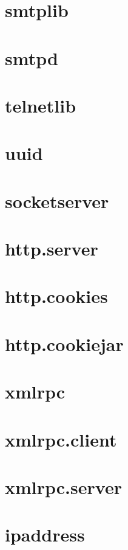 \section{smtplib}






\section{smtpd}






\section{telnetlib}






\section{uuid}






\section{socketserver}






\section{http.server}






\section{http.cookies}






\section{http.cookiejar}






\section{xmlrpc}







\section{xmlrpc.client}






\section{xmlrpc.server}






\section{ipaddress}


